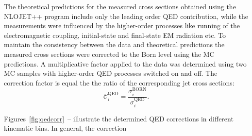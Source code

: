 The theoretical predictions for the measured cross sections obtained using the NLOJET++ program include only the leading order QED contribution, while the measurements were influenced by the higher-order processes like running of the electromagnetic coupling, initial-state and final-state EM radiation etc. To maintain the consistency between the data and theoretical predictions the measured cross sections were corrected to the Born level using the MC predictions. A multiplicative factor applied to the data was determined using two \lepto MC samples with higher-order QED processes switched on and off. The correction factor is equal the the ratio of the corresponding jet cross sections:
\begin{equation}
 \mathcal{C}^\text{QED}_i = \frac{\sigma_i^\text{BORN}}{\sigma_i^\text{QED}}.
 \label{eq:eqdcorr}
\end{equation}

Figures~\ref{fig:qedcorr}~-- illustrate the determined QED corrections in different kinematic bins. In general, the correction
 

